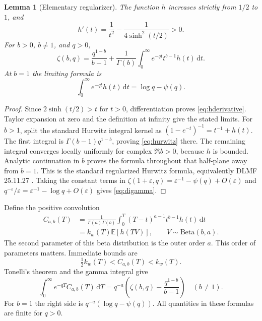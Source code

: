 \documentclass[11pt]{article}
\numberwithin{equation}{section}
\newtheorem{lemma}[theorem]{Lemma}
\theoremstyle{definition}\newtheorem{definition}[theorem]{Definition}
\theoremstyle{remark}\newtheorem{remark}[theorem]{Remark}
\newcommand{\dd}{\,\mathrm d}
\newcommand{\E}{\mathbb E}
\begin{document}
\begin{lemma}[Elementary regularizer]\label{lem:h}
The function $h$ increases strictly from $1/2$ to $1$, and
\begin{equation}\label{eq:hderivative}
 h'(t)=\frac1{t^2}-\frac1{4\sinh^2(t/2)}>0.
\end{equation}
For $b>0$, $b\ne1$, and $q>0$,
\begin{equation}\label{eq:hurwitz}
 \zeta(b,q)=\frac{q^{1-b}}{b-1}
 +\frac1{\Gamma(b)}\int_0^\infty e^{-qt}t^{b-1}h(t)\dd t.
\end{equation}
At $b=1$ the limiting formula is
\begin{equation}\label{eq:digamma}
 \int_0^\infty e^{-qt}h(t)\dd t=\log q-\psi(q).
\end{equation}
\end{lemma}
\begin{proof}
Since $2\sinh(t/2)>t$ for $t>0$, differentiation proves
\eqref{eq:hderivative}. Taylor expansion at zero and the definition
at infinity give the stated limits. For $b>1$, split the standard
Hurwitz integral kernel as
$(1-e^{-t})^{-1}=t^{-1}+h(t)$. The first integral is
$\Gamma(b-1)q^{1-b}$, proving \eqref{eq:hurwitz} there.
The remaining integral converges locally uniformly for complex
$\Re b>0$, because $h$ is bounded. Analytic continuation in $b$
proves the formula throughout that half-plane away from $b=1$.
This is the standard regularized Hurwitz formula, equivalently
DLMF 25.11.27 \cite{dlmf-hurwitz}. Taking the constant terms in
$\zeta(1+\varepsilon,q)=\varepsilon^{-1}-\psi(q)+O(\varepsilon)$
and $q^{-\varepsilon}/\varepsilon=\varepsilon^{-1}-\log q+O(\varepsilon)$
gives \eqref{eq:digamma}.
\end{proof}

Define the positive convolution
\begin{align}
 C_{a,b}(T)
 &=\frac1{\Gamma(a)\Gamma(b)}
   \int_0^T(T-t)^{a-1}t^{b-1}h(t)\dd t\label{eq:C}\\
 &=k_w(T)\E[h(TV)],\qquad V\sim\mathrm{Beta}(b,a).
 \label{eq:Cbeta}
\end{align}
The second parameter of this beta distribution is the outer order
$a$. This order of parameters matters. Immediate bounds are
\begin{equation}\label{eq:Cbounds}
 \tfrac12 k_w(T)<C_{a,b}(T)<k_w(T).
\end{equation}
Tonelli's theorem and the gamma integral give
\begin{equation}\label{eq:CLaplace}
 \int_0^\infty e^{-qT}C_{a,b}(T)\dd T
 =q^{-a}\left(\zeta(b,q)-\frac{q^{1-b}}{b-1}\right)
 \quad(b\ne1).
\end{equation}
For $b=1$ the right side is $q^{-a}(\log q-\psi(q))$.
All quantities in these formulas are finite for $q>0$.
\end{document}
